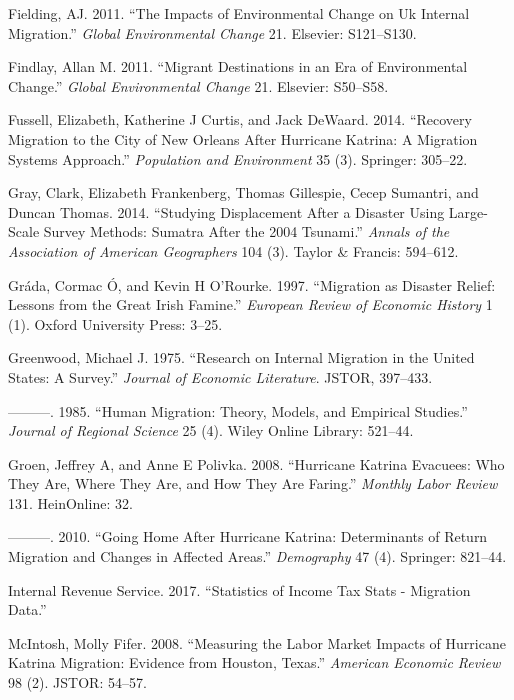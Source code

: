 \documentclass[]{article}
\begin{document}
\hypertarget{ref-fielding2011impacts}{}
Fielding, AJ. 2011. ``The Impacts of Environmental Change on Uk Internal
Migration.'' \emph{Global Environmental Change} 21. Elsevier:
S121--S130.

\hypertarget{ref-findlay2011migrant}{}
Findlay, Allan M. 2011. ``Migrant Destinations in an Era of
Environmental Change.'' \emph{Global Environmental Change} 21. Elsevier:
S50--S58.

\hypertarget{ref-fussell2014recovery}{}
Fussell, Elizabeth, Katherine J Curtis, and Jack DeWaard. 2014.
``Recovery Migration to the City of New Orleans After Hurricane Katrina:
A Migration Systems Approach.'' \emph{Population and Environment} 35
(3). Springer: 305--22.

\hypertarget{ref-gray2014studying}{}
Gray, Clark, Elizabeth Frankenberg, Thomas Gillespie, Cecep Sumantri,
and Duncan Thomas. 2014. ``Studying Displacement After a Disaster Using
Large-Scale Survey Methods: Sumatra After the 2004 Tsunami.''
\emph{Annals of the Association of American Geographers} 104 (3). Taylor
\& Francis: 594--612.

\hypertarget{ref-grada1997migration}{}
Gráda, Cormac Ó, and Kevin H O'Rourke. 1997. ``Migration as Disaster
Relief: Lessons from the Great Irish Famine.'' \emph{European Review of
Economic History} 1 (1). Oxford University Press: 3--25.

\hypertarget{ref-greenwood1975research}{}
Greenwood, Michael J. 1975. ``Research on Internal Migration in the
United States: A Survey.'' \emph{Journal of Economic Literature}. JSTOR,
397--433.

\hypertarget{ref-greenwood1985human}{}
---------. 1985. ``Human Migration: Theory, Models, and Empirical
Studies.'' \emph{Journal of Regional Science} 25 (4). Wiley Online
Library: 521--44.

\hypertarget{ref-groen2008hurricane}{}
Groen, Jeffrey A, and Anne E Polivka. 2008. ``Hurricane Katrina
Evacuees: Who They Are, Where They Are, and How They Are Faring.''
\emph{Monthly Labor Review} 131. HeinOnline: 32.

\hypertarget{ref-groen2010going}{}
---------. 2010. ``Going Home After Hurricane Katrina: Determinants of
Return Migration and Changes in Affected Areas.'' \emph{Demography} 47
(4). Springer: 821--44.

\hypertarget{ref-irsmigdata}{}
Internal Revenue Service. 2017. ``Statistics of Income Tax Stats -
Migration Data.''

\hypertarget{ref-mcintosh2008measuring}{}
McIntosh, Molly Fifer. 2008. ``Measuring the Labor Market Impacts of
Hurricane Katrina Migration: Evidence from Houston, Texas.''
\emph{American Economic Review} 98 (2). JSTOR: 54--57.
\end{document}
